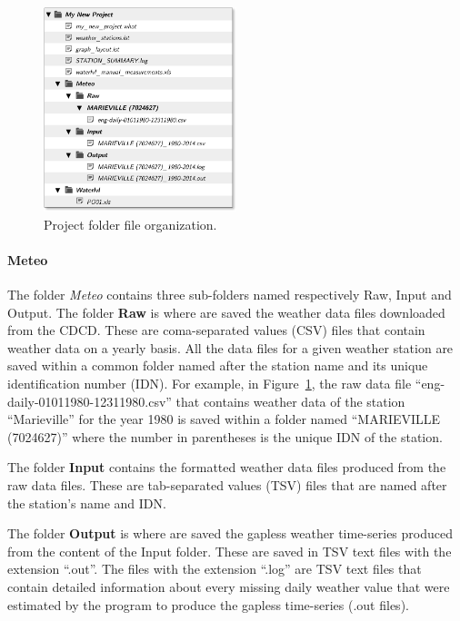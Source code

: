 \documentclass[12pt, letterpaper, fleqn]{report}
\begin{document}
\begin{figure}
\centering
\includegraphics[width=0.5\textwidth]{file_and_folder_architecture}
\caption[Project folder file organization.]{Project folder file organization.}
\label{fig:proFolder_organization}
\end{figure}

\paragraph{Meteo} The folder \emph{Meteo} contains three sub-folders named respectively Raw, Input and Output. The folder \textbf{Raw} is where are saved the weather data files downloaded from the CDCD. These are coma-separated values (CSV) files that contain weather data on a yearly basis. All the data files for a given weather station are saved within a common folder named after the station name and its unique identification number (IDN). For example, in Figure~\ref{fig:proFolder_organization}, the raw data file ``eng-daily-01011980-12311980.csv'' that contains weather data of the station ``Marieville'' for the year 1980 is saved within a folder named ``MARIEVILLE (7024627)'' where the number in parentheses is the unique IDN of the station.

The folder \textbf{Input} contains the formatted weather data files produced from the raw data files. These are tab-separated values (TSV) files that are named after the station's name and IDN.

The folder \textbf{Output} is where are saved the gapless weather time-series produced from the content of the Input folder. These are saved in TSV text files with the extension ``.out''. The files with the extension ``.log'' are TSV text files that contain detailed information about every missing daily weather value that were estimated by the program to produce the gapless time-series (.out files).
\end{document}
